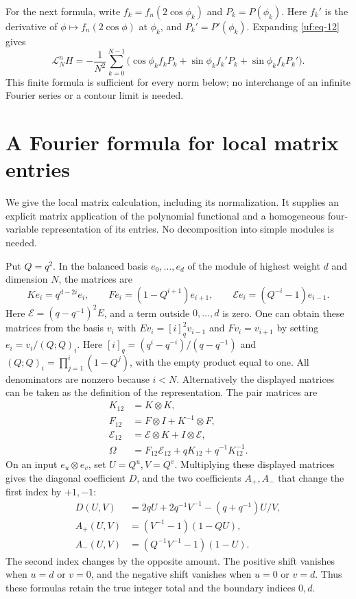 \documentclass[11pt]{article}
\numberwithin{equation}{section}
\theoremstyle{definition}\newtheorem{definition}[theorem]{Definition}
\theoremstyle{remark}\newtheorem{remark}[theorem]{Remark}
\begin{document}
For the next formula, write $f_k=f_n(2\cos\phi_k)$ and
$P_k=P(\phi_k)$. Here $f_k'$ is the derivative of
$\phi\mapsto f_n(2\cos\phi)$ at $\phi_k$, and
$P_k'=P'(\phi_k)$. Expanding \eqref{uf:eq-12} gives
\begin{equation}\label{uf:eq-15}
\mathcal L_N^{n}H=-\frac1{N^2}\sum_{k=0}^{N-1}
       \bigl(\cos\phi_k f_kP_k+
        \sin\phi_k f_k'P_k+\sin\phi_k f_kP_k'\bigr).
\end{equation} This finite formula is sufficient for every norm below; no
interchange of an infinite Fourier series or a contour limit is needed.

\section{A Fourier formula for local matrix entries}
\label{uf:local-fourier}

We give the local matrix calculation, including its normalization.
It supplies an explicit matrix application of the polynomial
functional and a homogeneous four-variable representation of its entries. No decomposition into simple modules is needed.

Put \(Q=q^2\). In the balanced basis \(e_0,\ldots,e_d\) of the
module of highest weight $d$ and dimension $N$, the matrices are
\[
 K e_i=q^{d-2i}e_i,\qquad
 F e_i=(1-Q^{i+1})e_{i+1},\qquad
 \mathcal E e_i=(Q^{-i}-1)e_{i-1}.
\]
Here \(\mathcal E=(q-q^{-1})^2E\), and a term outside
\(0,\ldots,d\) is zero. One can obtain these matrices from the basis $v_i$ with
$Ev_i=[i]_q^2v_{i-1}$ and $Fv_i=v_{i+1}$ by setting
$e_i=v_i/(Q;Q)_i$. Here
$[i]_q=(q^i-q^{-i})/(q-q^{-1})$ and
$(Q;Q)_i=\prod_{j=1}^i(1-Q^j)$, with the empty product equal to one.
All denominators are nonzero because $i<N$. Alternatively the displayed
matrices can be taken as the definition of the representation. The pair matrices are
\[
 \begin{split}
 K_{12}&=K\otimes K,\\
 F_{12}&=F\otimes I+K^{-1}\otimes F,\\
 \mathcal E_{12}&=\mathcal E\otimes K+I\otimes\mathcal E,\\
 \Omega&=F_{12}\mathcal E_{12}
                     +qK_{12}+q^{-1}K_{12}^{-1}.
 \end{split}
\]
On an input \(e_u\otimes e_v\), set \(U=Q^u,V=Q^v\).
Multiplying these displayed matrices gives the diagonal coefficient
\(D\), and the two coefficients \(A_+,A_-\) that change the first
index by \(+1,-1\):
\begin{equation}\label{uf:casimir-three-entries}
\begin{split}
 D(U,V)&=2qU+2q^{-1}V^{-1}-(q+q^{-1})U/V,\\
 A_+(U,V)&=(V^{-1}-1)(1-QU),\\
 A_-(U,V)&=(Q^{-1}V^{-1}-1)(1-U).
\end{split}
\end{equation}
The second index changes by the opposite amount. The positive shift
vanishes when \(u=d\) or \(v=0\), and the negative shift vanishes
when \(u=0\) or \(v=d\). Thus these formulas retain the true
integer total and the boundary indices $0,d$.
\end{document}
